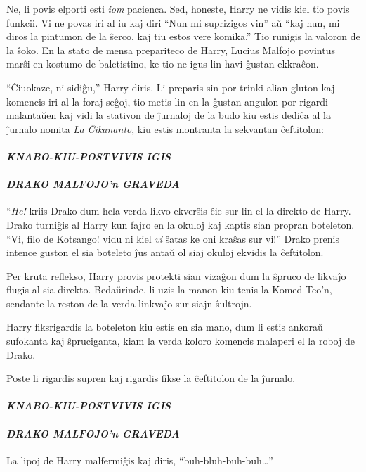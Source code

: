 Ne, li povis elporti esti \emph{iom} pacienca. Sed, honeste, Harry ne
vidis kiel tio povis funkcii. Vi ne povas iri al iu kaj diri ``Nun mi
suprizigos vin'' aŭ ``kaj nun, mi diros la pintumon de
la ŝerco, kaj tiu estos vere komika.'' Tio runigis la valoron de la
ŝoko. En la stato de mensa prepariteco de Harry, Lucius Malfojo
povintus marŝi en kostumo de baletistino, ke tio ne igus lin havi
ĝustan ekkraĉon.

``Ĉiuokaze, ni sidiĝu,'' Harry diris. Li preparis sin por trinki alian
gluton kaj komencis iri al la foraj seĝoj, tio metis lin en la ĝustan
angulon por rigardi malantaŭen kaj vidi la stativon de ĵurnaloj de la
budo kiu estis dediĉa al la ĵurnalo nomita \emph{La Ĉikananto}, kiu
estis montranta la sekvantan ĉeftitolon:

\paragraph{\emph{KNABO-KIU-POSTVIVIS IGIS}}

\paragraph{\emph{DRAKO MALFOJO'n GRAVEDA}} ``\emph{He!} kriis Drako dum
hela verda likvo ekverŝis ĉie sur lin el la direkto de Harry. Drako
turniĝis al Harry kun fajro en la okuloj kaj kaptis sian propran
boteleton. ``Vi, filo de Kotsango! vidu ni kiel \emph{vi} ŝatas ke oni
kraŝas sur vi!'' Drako prenis intence guston el sia boteleto ĵus antaŭ
ol siaj okuloj ekvidis la ĉeftitolon.

Per kruta reflekso, Harry provis protekti sian vizaĝon dum la ŝpruco
de likvaĵo flugis al sia direkto. Bedaŭrinde, li uzis la manon kiu
tenis la Komed-Teo'n, sendante la reston de la verda linkvaĵo sur
siajn ŝultrojn.

Harry fiksrigardis la boteleton kiu estis en sia mano, dum li estis
ankoraŭ sufokanta kaj ŝpruciganta, kiam la verda koloro komencis
malaperi el la roboj de Drako.

Poste li rigardis supren kaj rigardis fikse la ĉeftitolon de la ĵurnalo.

\paragraph{\emph{KNABO-KIU-POSTVIVIS IGIS}}

\paragraph{\emph{DRAKO MALFOJO'n GRAVEDA}} La lipoj de Harry malfermiĝis
kaj diris, ``buh-bluh-buh-buh\ldots''

